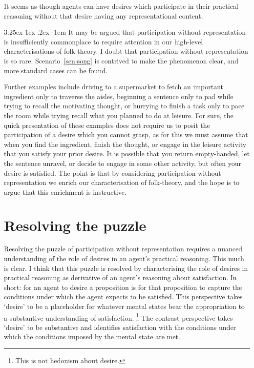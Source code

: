 \documentclass[10pt]{article}
\makeatletter
\renewcommand\paragraph{\@startsection{paragraph}{5}{\z@}%
  {3.25ex \@plus1ex \@minus.2ex}%
  {-1em}%
  {\normalfont\normalsize\bfseries}}
\makeatother
\begin{document}
It seems as though agents can have desires which participate in their practical reasoning without that desire having any representational content.

\paragraph{ }
It may be argued that participation without representation is insufficiently commonplace to require attention in our high-level characterisations of folk-theory.
I doubt that participation without representation is so rare.
Scenario~\ref{scn:song} is contrived to make the phenomenon clear, and more standard cases can be found.

Further examples include driving to a supermarket to fetch an important ingredient only to traverse the aisles, beginning a sentence only to pad while trying to recall the motivating thought, or hurrying to finish a task only to pace the room while trying recall what you planned to do at leisure.
For sure, the quick presentation of these examples does not require us to posit the participation of a desire which you cannot grasp, as for this we must assume that when you find the ingredient, finish the thought, or engage in the leisure activity that you satisfy your prior desire.
It is possible that you return empty-handed, let the sentence unravel, or decide to engage in some other activity, but often your desire is satisfied.
The point is that by considering participation without representation we enrich our characterisation of folk-theory, and the hope is to argue that this enrichment is instructive.

\section{Resolving the puzzle}
\label{sec:resolving-puzzle}

Resolving the puzzle of participation without representation requires a nuanced understanding of the role of desires in an agent's practical reasoning.
This much is clear.
I think that this puzzle is resolved by characterising the role of desires in practical reasoning as derivative of an agent's reasoning about satisfaction.
In short: for an agent to desire a proposition is for that proposition to capture the conditions under which the agent expects to be satisfied.
This perspective takes `desire' to be a placeholder for whatever mental states bear the appropriation to a substantive understanding of satisfaction.\nolinebreak
\footnote{This is not hedonism about desire.}
The contrast perspective takes `desire' to be substantive and identifies satisfaction with the conditions under which the conditions imposed by the mental state are met.
\end{document}
